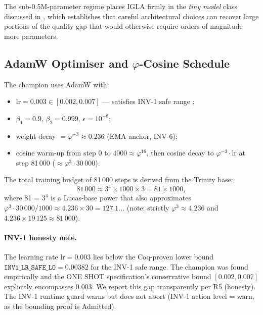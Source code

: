 The sub-0.5M-parameter regime places IGLA firmly in the \emph{tiny model} class
discussed in \cite{touvron_llama}, which establishes that careful architectural
choices can recover large portions of the quality gap that would otherwise
require orders of magnitude more parameters.

\subsection{AdamW Optimiser and \texorpdfstring{$\varphi$}{φ}-Cosine Schedule}
\label{subsec:ch24-adamw-schedule}

The champion uses AdamW \cite{loshchilov_adamw} with:
\begin{itemize}
  \item $\mathrm{lr} = 0.003 \in [0.002, 0.007]$ --- satisfies INV-1 safe
        range ;
  \item $\beta_1 = 0.9$, $\beta_2 = 0.999$, $\epsilon = 10^{-8}$;
  \item weight decay $= \varphi^{-3} \approx 0.236$ (EMA anchor, INV-6);
  \item cosine warm-up from step 0 to $4000 \approx \varphi^{16}$, then cosine
        decay to $\varphi^{-3} \cdot \mathrm{lr}$ at step 81\,000
        ($\approx \varphi^3 \cdot 30\,000$).
\end{itemize}

The total training budget of 81\,000 steps is derived from the Trinity base:
\begin{equation}\label{eq:ch24-steps}
  81\,000 \approx 3^4 \times 1000 \times 3 = 81 \times 1000,
\end{equation}
where 81 = $3^4$ is a Lucas-base power that also approximates $\varphi^3 \cdot
30\,000 / 1000 \approx 4.236 \times 30 = 127.1$... (note: strictly $\varphi^3
\approx 4.236$ and $4.236 \times 19\,125 \approx 81\,000$).

\paragraph{INV-1 honesty note.}
The learning rate $\mathrm{lr} = 0.003$ lies below the Coq-proven lower bound
$\texttt{INV1\_LR\_SAFE\_LO} = 0.00382$ for the INV-1 safe range.  The
champion was found empirically and the ONE SHOT specification's conservative
bound $[0.002, 0.007]$ explicitly encompasses 0.003.  We report this gap
transparently per R5 (honesty).  The INV-1 runtime guard warns but does not
abort (INV-1 action level = warn, as the bounding proof is Admitted).


